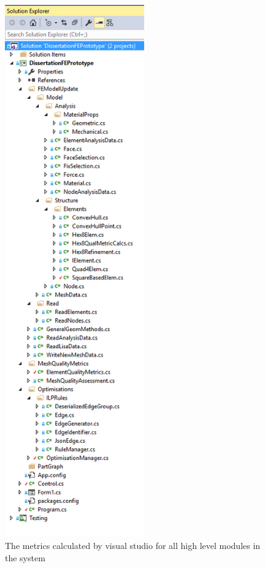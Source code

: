 \begin{figure}[h!!]
  \centerline{\includegraphics[width=60mm, scale=0.5]{../Graphics/VSolutionExplorer.png}}
  \caption{The metrics calculated by visual studio for all high level modules in the system}
\end{figure}


